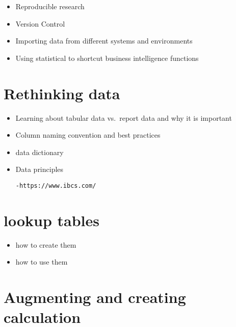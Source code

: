 \documentclass[
  letterpaper,
  DIV=11,
  numbers=noendperiod]{scrreprt}
\providecommand{\tightlist}{%
  \setlength{\itemsep}{0pt}\setlength{\parskip}{0pt}}\usepackage{longtable,booktabs,array}
\begin{document}
\begin{itemize}
\tightlist
\item
  Reproducible research
\item
  Version Control
\item
  Importing data from different systems and environments
\item
  Using statistical to shortcut business intelligence functions
\end{itemize}

\section*{Rethinking data}\label{rethinking-data}


\begin{itemize}
\item
  Learning about tabular data vs.~report data and why it is important
\item
  Column naming convention and best practices
\item
  data dictionary
\item
  Data principles

\begin{verbatim}
-https://www.ibcs.com/
\end{verbatim}
\end{itemize}

\section*{lookup tables}\label{lookup-tables}


\begin{itemize}
\tightlist
\item
  how to create them
\item
  how to use them
\end{itemize}

\section*{Augmenting and creating
calculation}\label{augmenting-and-creating-calculation}

\end{document}
